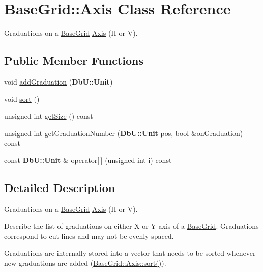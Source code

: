 \hypertarget{classKatabatic_1_1BaseGrid_1_1Axis}{\section{Base\-Grid\-:\-:Axis Class Reference}
\label{classKatabatic_1_1BaseGrid_1_1Axis}
}


Graduations on a \hyperlink{classKatabatic_1_1BaseGrid}{Base\-Grid} \hyperlink{classKatabatic_1_1BaseGrid_1_1Axis}{Axis} (H or V).  


\subsection*{Public Member Functions}
\begin{DoxyCompactItemize}
\item 
void \hyperlink{classKatabatic_1_1BaseGrid_1_1Axis_ada526136545060f41e8b9228ce1c5895}{add\-Graduation} ({\bf Db\-U\-::\-Unit})
\item 
void \hyperlink{classKatabatic_1_1BaseGrid_1_1Axis_a47fdc9eea42b6975cdc835bb2e08810e}{sort} ()
\item 
unsigned int \hyperlink{classKatabatic_1_1BaseGrid_1_1Axis_af55b3790622878d65ed5ff2bb2b3fcc4}{get\-Size} () const 
\item 
unsigned int \hyperlink{classKatabatic_1_1BaseGrid_1_1Axis_a5c8a687396db80839515c1f04c205f9e}{get\-Graduation\-Number} ({\bf Db\-U\-::\-Unit} pos, bool \&on\-Graduation) const 
\item 
const {\bf Db\-U\-::\-Unit} \& \hyperlink{classKatabatic_1_1BaseGrid_1_1Axis_a15b53d212638c335c75fe7fd0390716c}{operator\mbox{[}$\,$\mbox{]}} (unsigned int i) const 
\end{DoxyCompactItemize}


\subsection{Detailed Description}
Graduations on a \hyperlink{classKatabatic_1_1BaseGrid}{Base\-Grid} \hyperlink{classKatabatic_1_1BaseGrid_1_1Axis}{Axis} (H or V). 

Describe the list of graduations on either X or Y axis of a \hyperlink{classKatabatic_1_1BaseGrid}{Base\-Grid}. Graduations correspond to cut lines and may not be evenly spaced.

Graduations are internally stored into a vector that needs to be sorted whenever new graduations are added (\hyperlink{classKatabatic_1_1BaseGrid_1_1Axis_a47fdc9eea42b6975cdc835bb2e08810e}{Base\-Grid\-::\-Axis\-::sort()}). 

